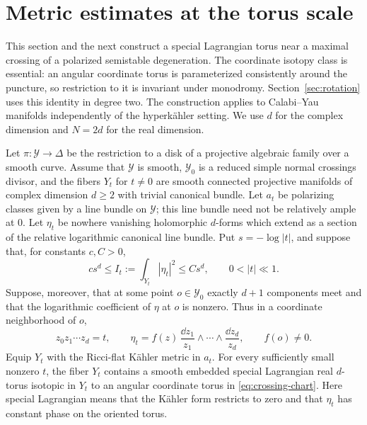 \section{Metric estimates at the torus scale}
\label{sec:metric-estimates}

This section and the next construct a special Lagrangian torus near a
maximal crossing of a polarized semistable degeneration. The coordinate
isotopy class is essential: an angular coordinate torus is parameterized
consistently around the puncture, so restriction to it is invariant under
monodromy. Section~\ref{sec:rotation} uses this identity in degree two.
The construction applies to Calabi--Yau manifolds independently of the
hyperk\"ahler setting. We use $d$ for the complex dimension and $N=2d$
for the real dimension.

\begin{theorem}
\label{thm:torus}
Let $\pi:\mathcal Y\to\Delta$ be the restriction to a disk of a projective
algebraic family over a smooth curve.  Assume that $\mathcal Y$ is smooth,
$\mathcal Y_0$ is a reduced simple normal crossings divisor, and the fibers
$Y_t$ for $t\ne0$ are smooth connected projective manifolds of complex
dimension $d\ge2$ with trivial canonical bundle.  Let $a_t$ be polarizing
classes given by a line bundle on $\mathcal Y$; this line bundle need not
be relatively ample at $0$.  Let $\eta_t$ be nowhere vanishing holomorphic
$d$-forms which extend as a section of the relative logarithmic canonical
line bundle.  Put $s=-\log|t|$, and suppose that, for constants $c,C>0$,
\begin{equation}
 c s^d\le I_t:=\int_{Y_t}|\eta_t|^2\le C s^d,
 \qquad 0<|t|\ll1.
 \label{eq:log-volume-growth}
\end{equation}
Suppose, moreover, that at some point $o\in\mathcal Y_0$ exactly $d+1$
components meet and that the logarithmic coefficient of $\eta$ at $o$ is
nonzero.  Thus in a coordinate neighborhood of $o$,
\begin{equation}
 z_0z_1\cdots z_d=t,
 \qquad
 \eta_t=f(z)\,\frac{\dd z_1}{z_1}\wedge\cdots\wedge
                         \frac{\dd z_d}{z_d},
 \qquad f(o)\ne0.
 \label{eq:crossing-chart}
\end{equation}
Equip $Y_t$ with the Ricci-flat K\"ahler metric in $a_t$.
For every sufficiently small nonzero $t$, the fiber $Y_t$ contains a
smooth embedded special Lagrangian real $d$-torus isotopic in $Y_t$ to an
angular coordinate torus in \eqref{eq:crossing-chart}.
Here special Lagrangian means that the K\"ahler form restricts to zero and
that $\eta_t$ has constant phase on the oriented torus.
\end{theorem}

